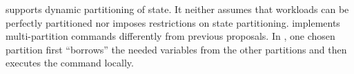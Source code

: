 \dynastar supports dynamic partitioning of state.
It neither assumes that workloads can be perfectly partitioned nor imposes restrictions on state partitioning.
\dynastar implements multi-partition commands differently from previous proposals.
In \dynastar, one chosen partition first ``borrows'' the needed variables from the other partitions and then executes the command locally.

